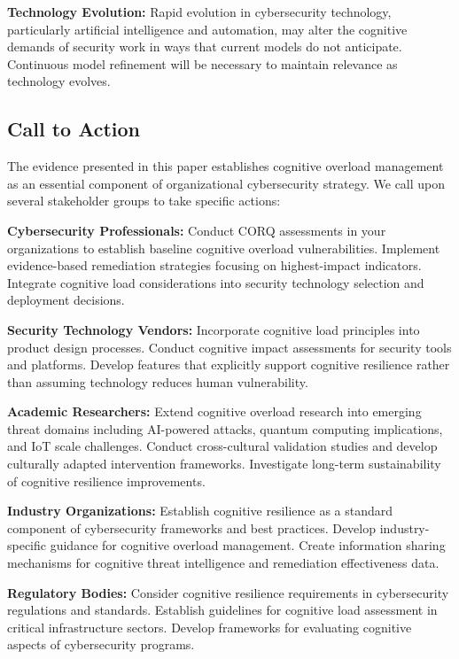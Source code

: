 \documentclass[11pt,a4paper]{article}
\begin{document}
\textbf{Technology Evolution:} Rapid evolution in cybersecurity technology, particularly artificial intelligence and automation, may alter the cognitive demands of security work in ways that current models do not anticipate. Continuous model refinement will be necessary to maintain relevance as technology evolves.

\subsection{Call to Action}

The evidence presented in this paper establishes cognitive overload management as an essential component of organizational cybersecurity strategy. We call upon several stakeholder groups to take specific actions:

\textbf{Cybersecurity Professionals:} Conduct CORQ assessments in your organizations to establish baseline cognitive overload vulnerabilities. Implement evidence-based remediation strategies focusing on highest-impact indicators. Integrate cognitive load considerations into security technology selection and deployment decisions.

\textbf{Security Technology Vendors:} Incorporate cognitive load principles into product design processes. Conduct cognitive impact assessments for security tools and platforms. Develop features that explicitly support cognitive resilience rather than assuming technology reduces human vulnerability.

\textbf{Academic Researchers:} Extend cognitive overload research into emerging threat domains including AI-powered attacks, quantum computing implications, and IoT scale challenges. Conduct cross-cultural validation studies and develop culturally adapted intervention frameworks. Investigate long-term sustainability of cognitive resilience improvements.

\textbf{Industry Organizations:} Establish cognitive resilience as a standard component of cybersecurity frameworks and best practices. Develop industry-specific guidance for cognitive overload management. Create information sharing mechanisms for cognitive threat intelligence and remediation effectiveness data.

\textbf{Regulatory Bodies:} Consider cognitive resilience requirements in cybersecurity regulations and standards. Establish guidelines for cognitive load assessment in critical infrastructure sectors. Develop frameworks for evaluating cognitive aspects of cybersecurity programs.
\end{document}
